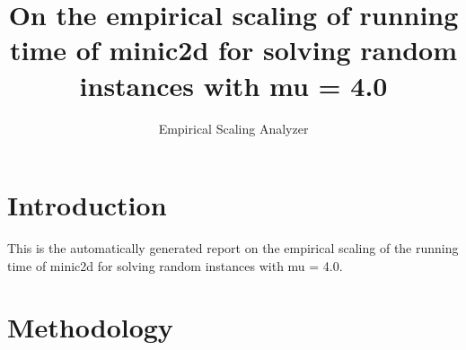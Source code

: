 \newcommand{\updatedYP}[1]{#1}
\newcommand{\yp}[1]{#1}
\newcommand{\orange}[1]{#1}
\newcommand{\evalModels}[1]{#1}
\newcommand{\bestBoot}[1]{#1}

\newcommand{\medianInterval}[1]{}
\newcommand{\randomizedAlgorithm}[1]{}
\newcommand{\quantileRegression}[1]{}
\renewcommand{\quantileRegression}[1]{#1}

\makeatletter

\providecommand{\tabularnewline}{\\}


\title{On the empirical scaling of running time of minic2d for solving random instances with mu = 4.0}
\author{Empirical Scaling Analyzer}

\makeatother

\usepackage{babel}

\maketitle %


\section{Introduction}

This is the automatically generated report on the empirical scaling
of the running time of minic2d for solving random instances with mu = 4.0.


\section{Methodology}

\label{sec:Methodology}

